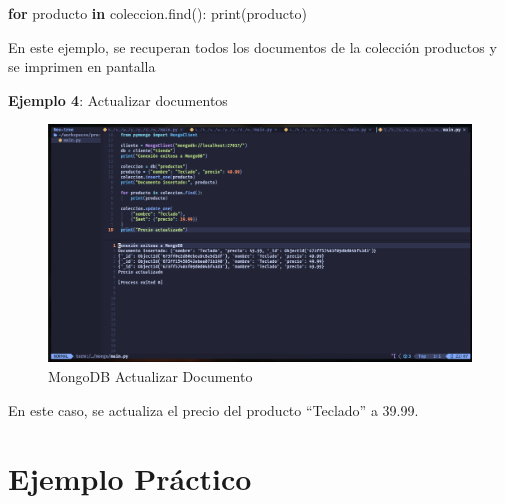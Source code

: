 \documentclass[
  a4paper,
  DIV=11,
  numbers=noendperiod,
  onepage,
  openany]{scrreprt}
\newenvironment{Shaded}{\begin{snugshade}}{\end{snugshade}}
\newcommand{\BuiltInTok}[1]{\textcolor[rgb]{0.00,0.23,0.31}{#1}}
\newcommand{\ControlFlowTok}[1]{\textcolor[rgb]{0.00,0.23,0.31}{\textbf{#1}}}
\newcommand{\FloatTok}[1]{\textcolor[rgb]{0.68,0.00,0.00}{#1}}
\newcommand{\KeywordTok}[1]{\textcolor[rgb]{0.00,0.23,0.31}{\textbf{#1}}}
\newcommand{\NormalTok}[1]{\textcolor[rgb]{0.00,0.23,0.31}{#1}}
\newcommand{\StringTok}[1]{\textcolor[rgb]{0.13,0.47,0.30}{#1}}
\begin{document}
\begin{Shaded}
\begin{Highlighting}[]
\ControlFlowTok{for}\NormalTok{ producto }\KeywordTok{in}\NormalTok{ coleccion.find():}
    \BuiltInTok{print}\NormalTok{(producto)}
\end{Highlighting}
\end{Shaded}

En este ejemplo, se recuperan todos los documentos de la colección
productos y se imprimen en pantalla

\textbf{Ejemplo 4}: Actualizar documentos

\begin{figure}[H]

{\centering \includegraphics[width=8.33333in,height=\textheight,keepaspectratio]{unidades/unidad6/./images/mongodb_code004.png}

}

\caption{MongoDB Actualizar Documento}

\end{figure}%

\begin{Shaded}
\end{Shaded}

En este caso, se actualiza el precio del producto ``Teclado'' a 39.99.

\section{Ejemplo Práctico}\label{ejemplo-pruxe1ctico-15}
\end{document}
